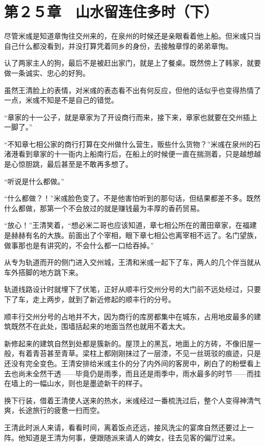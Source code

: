 \section{第２５章　山水留连住多时（下） }

尽管米彧是知道章恂往交州来的，在泉州的时候还是亲眼看着他上船。但米彧只当自己什么都没看到，并没打算凭着同乡的身份，去接触章惇的弟弟章恂。

认了两家主人的狗，最后不是被赶出家门，就是上了餐桌。既然傍上了韩家，就要做一条诚实、忠心的好狗。

虽然王清脸上的表情，对米彧的表态看不出有何反应，但他的话似乎也变得热情了一点，米彧不知是不是自己的错觉。

“章家的十一公子，就是章家为了开设商行而来，接下来，章家也就要在交州插上一脚了。”

“不知章七相公家的商行打算在交州做什么营生，贩些什么货物？”米彧在泉州的石渚港看到章家的十一衙内上船南行后，在船上的时候便一直在揣测着，只是越想越是心惊胆跳，最后甚至是不敢再多想了。

“听说是什么都做。”

“什么都做？！”米彧脸色变了。不是他害怕听到的那句话，但结果都差不多。既然什么都做，那第一个不会放过的就是赚钱最为丰厚的香药贸易。

“放心！”王清笑着，“想必米二哥也应该知道，章七相公所在的莆田章家，在福建是赫赫有名的大族。前面出了个宰相，眼下章七相公也离宰相不远了。名门望族，做事那也是有讲究的，不会什么都一口给吞掉。”

从专为轨道而开的侧门进入交州城，王清和米彧一起下了车，两人的几个伴当就从车外搭脚的地方跳下来。

轨道线路设计时就埋下了伏笔，正好从顺丰行交州分号的大门前不远处经过，只要下了车，走上两步，就到了新近修起的顺丰行的分号。

顺丰行交州分号的占地并不大，因为商行的库房都集中在城东，占用地皮最多的建筑既然不在此处，围墙括起来的地面当然也就用不着太大。

新修起来的建筑自然到处都是簇新的。屋顶上的黑瓦，地面上的方砖，不像旧屋一般，有着青苔甚至青草。梁柱上都刚刚抹过了一层漆，不见一丝斑驳的痕迹，只是还没有完全变色。王清安排给米彧主仆的分了内外间的客房中，刷白了的粉壁看上去也尚未全然干透——毕竟仍是雨季，而且还是雨季中，雨水最多的时节——而挂在墙上的一幅山水，则也是墨迹新干的样子。

换下行装，借着王清使人送来的热水，米彧经过一番梳洗过后，整个人变得神清气爽，长途旅行的疲惫一扫而空。

王清此时派人来请，看看时间，离着饭点还远，接风洗尘的宴席自然还要过上一阵。他知道是王清为何事，便跟随派来请人的婢女，往去见客的偏厅过来。

